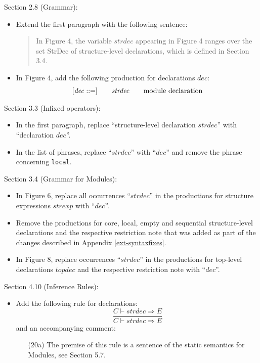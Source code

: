 \documentclass[twoside,titlepage]{article}
\begin{document}
\begin{appendix}
Section 2.8 (Grammar):
\begin{itemize}
\item Extend the first paragraph with the following sentence:
  \begin{quote}
  In Figure 4, the variable $\mathit{strdec}$ appearing in Figure 4 ranges over the set StrDec of structure-level declarations, which is defined in Section 3.4.
  \end{quote}

\item In Figure 4, add the following production for declarations $\mathit{dec}$:
  $$
  \begin{array}{l@{\qquad}l@{\qquad}l}
  [\mathit{dec} ::=] & \mathit{strdec} & \textrm{module declaration} \\
  \end{array}
  $$
\end{itemize}

Section 3.3 (Infixed operators):
\begin{itemize}
\item In the first paragraph, replace ``structure-level declaration $\mathit{strdec}$'' with ``declaration $\mathit{dec}$''.

\item In the list of phrases, replace ``$\mathit{strdec}$'' with ``$\mathit{dec}$'' and remove the phrase concerning {\tt local}.
\end{itemize}

Section 3.4 (Grammar for Modules):
\begin{itemize}
\item In Figure 6, replace all occurrences ``$\mathit{strdec}$'' in the productions for structure expressions $\mathit{strexp}$ with ``$\mathit{dec}$''.

\item Remove the productions for core, local, empty and sequential structure-level declarations and the respective restriction note that was added as part of the changes described in Appendix \ref{ext-syntaxfixes}.

\item In Figure 8, replace occurrences ``$\mathit{strdec}$'' in the productions for top-level declarations $\mathit{topdec}$ and the respective restriction note with ``$\mathit{dec}$''.
\end{itemize}

Section 4.10 (Inference Rules):
\begin{itemize}
\item Add the following rule for declarations:
  \begin{equation}
  \tag{20a}
  \frac{
  C \vdash \mathit{strdec} \Rightarrow E
  }{
  C \vdash \mathit{strdec} \Rightarrow E
  }
  \end{equation}
  and an accompanying comment:
  \begin{enumerate}
  \item[(20a)] The premise of this rule is a sentence of the static semantics for Modules, see Section 5.7.
  \end{enumerate}
\end{itemize}


\end{appendix}
\end{document}
